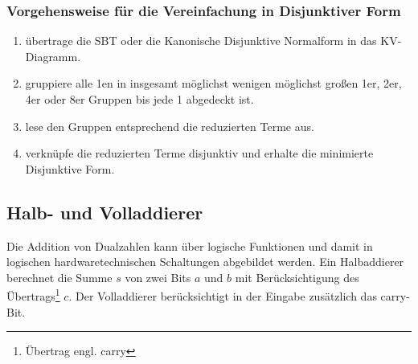 \documentclass[11pt,a4paper]{scrreprt}
\begin{document}
\subsubsection*{Vorgehensweise für die Vereinfachung in Disjunktiver Form}
\begin{enumerate}
  \item übertrage die SBT oder die Kanonische Disjunktive Normalform in das KV-Diagramm.
  \item gruppiere alle 1en in insgesamt möglichst wenigen möglichst großen 1er, 2er, 4er oder 8er Gruppen  bis jede 1 abgedeckt ist.
  \item lese den Gruppen entsprechend die reduzierten Terme aus.
  \item verknüpfe die reduzierten Terme disjunktiv und erhalte die minimierte Disjunktive Form.
\end{enumerate}

\subsection{Halb- und Volladdierer}
Die Addition von Dualzahlen kann über logische Funktionen und damit in logischen hardwaretechnischen Schaltungen abgebildet werden. Ein Halbaddierer berechnet die Summe $s$ von zwei Bits $a$ und $b$ mit Berücksichtigung des Übertrags\footnote{Übertrag engl. carry} $c$. Der Volladdierer berücksichtigt in der Eingabe zusätzlich das carry-Bit.
\end{document}
